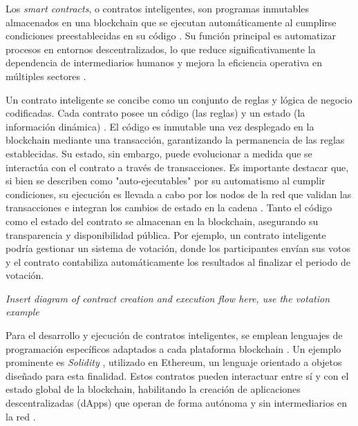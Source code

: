 Los \textit{smart contracts}, o contratos inteligentes, son programas inmutables almacenados en una blockchain que se ejecutan automáticamente al cumplirse condiciones preestablecidas en su código \cite{bulkowska2023implementation}. Su función principal es automatizar procesos en entornos descentralizados, lo que reduce significativamente la dependencia de intermediarios humanos \cite{verma2023overview} y mejora la eficiencia operativa en múltiples sectores \cite{sunny2022systematic}.

Un contrato inteligente se concibe como un conjunto de reglas y lógica de negocio codificadas. Cada contrato posee un código (las reglas) y un estado (la información dinámica) \cite{buterin2013ethereum}. El código es inmutable una vez desplegado en la blockchain mediante una transacción, garantizando la permanencia de las reglas establecidas. Su estado, sin embargo, puede evolucionar a medida que se interactúa con el contrato a través de transacciones. Es importante destacar que, si bien se describen como "auto-ejecutables" por su automatismo al cumplir condiciones, su ejecución es llevada a cabo por los nodos de la red que validan las transacciones e integran los cambios de estado en la cadena \cite{buterin2013ethereum}. Tanto el código como el estado del contrato se almacenan en la blockchain, asegurando su transparencia y disponibilidad pública. Por ejemplo, un contrato inteligente podría gestionar un sistema de votación, donde los participantes envían sus votos y el contrato contabiliza automáticamente los resultados al finalizar el periodo de votación.

\begin{block}[todo] %
    \textit{Insert diagram of contract creation and execution flow here, use the votation example}
\end{block}

Para el desarrollo y ejecución de contratos inteligentes, se emplean lenguajes de programación específicos adaptados a cada plataforma blockchain \cite{bartolomeo2020introduccion}. Un ejemplo prominente es \textit{Solidity} \cite{taherdoost2023smart}, utilizado en Ethereum, un lenguaje orientado a objetos diseñado para esta finalidad. Estos contratos pueden interactuar entre sí y con el estado global de la blockchain, habilitando la creación de aplicaciones descentralizadas (dApps) que operan de forma autónoma y sin intermediarios en la red \cite{buterin2013ethereum}.

